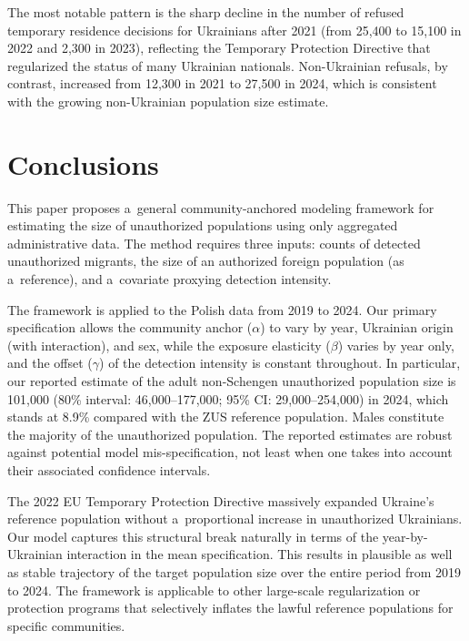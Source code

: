 The most notable pattern is the sharp decline in the number of refused temporary residence decisions for Ukrainians after 2021 (from 25,400 to 15,100 in 2022 and 2,300 in 2023), reflecting the Temporary Protection Directive that regularized the status of many Ukrainian nationals. Non-Ukrainian refusals, by contrast, increased from 12,300 in 2021 to 27,500 in 2024, which is consistent with the growing non-Ukrainian population size estimate. 


\section{Conclusions}\label{sec-conclusions}

This paper proposes a~general community-anchored modeling framework for estimating the size of unauthorized populations using only aggregated
administrative data. The method requires three inputs: counts of detected unauthorized migrants, the size of an authorized foreign population (as a~reference), and a~covariate proxying detection intensity. 

The framework is applied to the Polish data from 2019 to 2024. Our primary specification allows the community anchor ($\alpha$) to vary by year, Ukrainian origin (with interaction), and sex, while the exposure elasticity ($\beta$) varies by year only, and the offset ($\gamma$) of the detection intensity is constant throughout. In particular, our reported estimate of the adult non-Schengen unauthorized population size is 101,000 (80\% interval: 46,000--177,000; 95\% CI: 29,000--254,000) in 2024, which stands at 8.9\% compared with the ZUS reference population. Males constitute the majority of the unauthorized population. The reported estimates are robust against potential model mis-specification, not least when one takes into account their associated confidence intervals. 


The 2022 EU Temporary Protection Directive massively expanded Ukraine's reference population without a~proportional increase in unauthorized Ukrainians. Our model captures this structural break naturally in terms of the year-by-Ukrainian interaction in the mean specification. This results in plausible as well as stable trajectory of the target population size over the entire period from 2019 to 2024. The framework is applicable to other large-scale regularization or protection programs that selectively inflates the lawful reference populations for specific communities. 

